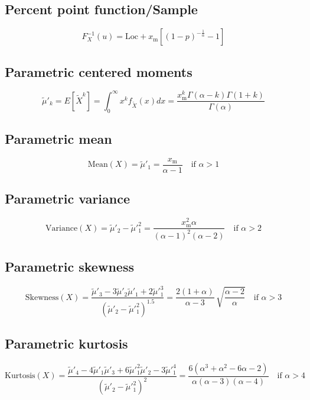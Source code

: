 \documentclass{article}
\begin{document}
\subsection{Percent point function/Sample}
\begin{equation*} F^{-1}_{X}\left(u\right)=\text{Loc}+x_\mathrm{m} \left[\left(1-p\right)^{-\frac{1}{\alpha}} -1\right] \end{equation*}
\subsection{Parametric centered moments}
\begin{equation*} \tilde{\mu}'_{k}=E[\tilde{X}^k]=\int_{0}^{\infty}x^{k}f_{\tilde{X}}\left(x\right)dx=\frac{x_\mathrm{m}^k \Gamma(\alpha-k)\Gamma(1+k)}{\Gamma(\alpha)} \end{equation*}
\subsection{Parametric mean}
\begin{equation*} \mathrm{Mean}(X)=\tilde{\mu}'_{1}=\frac{x_\mathrm{m}}{{\alpha -1}}  \quad \text{if }\alpha>1 \end{equation*}
\subsection{Parametric variance}
\begin{equation*} \mathrm{Variance}(X)=\tilde{\mu}'_{2}-\tilde{\mu}'^{2}_{1}=\frac{x_\mathrm{m}^2 \alpha}{(\alpha-1)^2(\alpha-2)} \quad \text{if }\alpha>2 \end{equation*}
\subsection{Parametric skewness}
\begin{equation*} \mathrm{Skewness}(X)=\frac{\tilde{\mu}'_{3}-3\tilde{\mu}'_{2}\tilde{\mu}'_{1}+2\tilde{\mu}'^{3}_{1}}{(\tilde{\mu}'_{2}-\tilde{\mu}'^{2}_{1})^{1.5}}=\frac{2(1+\alpha)}{\alpha-3}\,\sqrt{\frac{\alpha-2}{\alpha}} \quad \text{if }\alpha>3 \end{equation*}
\subsection{Parametric kurtosis}
\begin{equation*} \mathrm{Kurtosis}(X)=\frac{\tilde{\mu}'_{4}-4\tilde{\mu}'_{1}\tilde{\mu}'_{3}+6\tilde{\mu}'^{2}_{1}\tilde{\mu}'_{2}-3\tilde{\mu}'^{4}_{1}}{(\tilde{\mu}'_{2}-\tilde{\mu}'^{2}_{1})^{2}}=\frac{6(\alpha^3+\alpha^2-6\alpha-2)}{\alpha(\alpha-3)(\alpha-4)} \quad \text{if }\alpha>4 \end{equation*}
\end{document}
